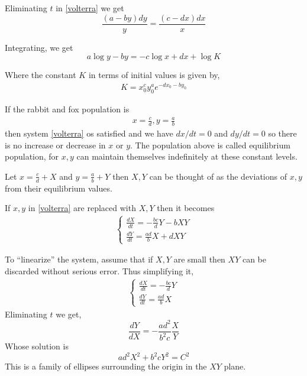 \documentclass[oneside,11pt,pdftex,final]{book}%
\numberwithin{equation}{section}
\numberwithin{section}{chapter}
\numberwithin{equation}{chapter}
\begin{document}
Eliminating $ t $ in \ref{volterra} we get
\[ \frac{(a-by)dy}{y}=\frac{(c-dx)dx}{x} \]

Integrating, we get
\[ a \log y -by = -c \log x + dx + \log K \]

Where the constant $ K $ in terms of initial values is given by,
\begin{align}
	K=x_0^cy_0^ae^{-dx_0-by_0} 
\end{align} 


If the rabbit and fox population is \begin{align}
	x=\frac{c}{d}, y=\frac{a}{b}
\end{align}  then system \ref{volterra} os satisfied and we have $ dx/dt=0 $ and $ dy/dt=0 $ so there is no increase or decrease in $ x $ or $ y $. The population above is called equilibrium population, for $ x,y $ can maintain themselves indefinitely at these constant levels.

Let $ x=\frac{c}{d}+X $ and $ y=\frac{a}{b} + Y$ then $ X,Y $ can be thought of as the deviations of $ x,y $ from their equilibrium values.

If $ x,y $ in \ref{volterra} are replaced with $ X,Y $ then it becomes
\begin{align}
	\begin{cases}
		\frac{dX}{dt}=-\frac{bc}{d}Y-bXY\\ 
		\frac{dY}{dt}=\frac{ad}{b}X+dXY
	\end{cases}
\end{align}

To ``linearize'' the system, assume that if $ X,Y $ are small then $ XY $ can be discarded without serious error. Thus simplifying it,
\begin{align}
	\begin{cases}
		\frac{dX}{dt}=-\frac{bc}{d}Y\\ 
		\frac{dY}{dt}=\frac{ad}{b}X
	\end{cases}
\end{align}
Eliminating $ t $ we get,
\[ \frac{dY}{dX}=-\frac{ad^2}{b^2c}\frac{X}{Y} \]
Whose solution is \[ ad^2X^2+b^2cY^2=C^2 \]
This is a family of ellipses surrounding the origin in the $ XY $ plane.
\end{document}
